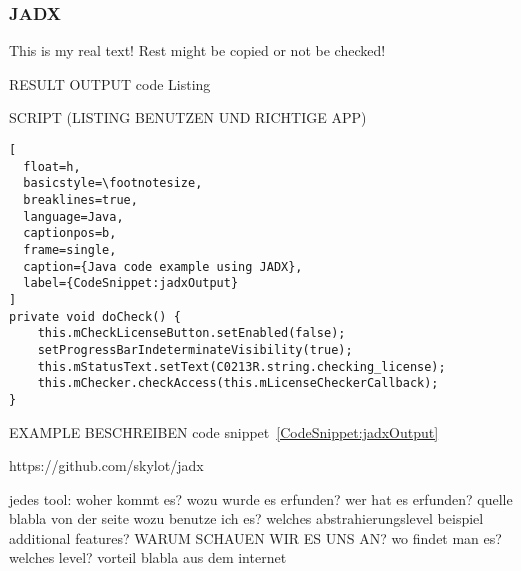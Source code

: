 \subsubsection{JADX} \label{subsubsection:forensics-tools-java-jadx}
This is my real text! Rest might be copied or not be checked!

RESULT OUTPUT
code Listing

SCRIPT (LISTING BENUTZEN UND RICHTIGE APP)


\begin{lstlisting}[
  float=h,
  basicstyle=\footnotesize,
  breaklines=true,
  language=Java,
  captionpos=b,
  frame=single,
  caption={Java code example using JADX},
  label={CodeSnippet:jadxOutput}
]
private void doCheck() {
    this.mCheckLicenseButton.setEnabled(false);
    setProgressBarIndeterminateVisibility(true);
    this.mStatusText.setText(C0213R.string.checking_license);
    this.mChecker.checkAccess(this.mLicenseCheckerCallback);
}
\end{lstlisting}
EXAMPLE BESCHREIBEN code snippet~\ref{CodeSnippet:jadxOutput}


https://github.com/skylot/jadx


jedes tool:\newline
woher kommt es?\newline
wozu wurde es erfunden?\newline
wer hat es erfunden? quelle\newline
blabla von der seite\newline
wozu benutze ich es?\newline
welches abstrahierungslevel\newline
beispiel\newline
additional features?\newline
WARUM SCHAUEN WIR ES UNS AN?\newline
wo findet man es?\newline
welches level?\newline
vorteil\newline
blabla aus dem internet\newline
